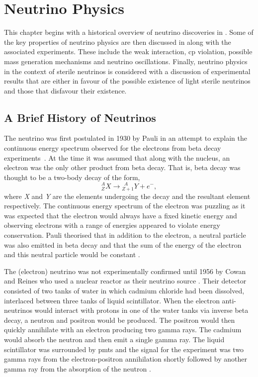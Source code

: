 \chapter{Neutrino Physics}
\label{chap:Neutrino Physics}

This chapter begins with a historical overview of neutrino discoveries in . Some of the key properties of neutrino physics are then discussed in  along with the associated experiments. These include the weak interaction, \gls{cp} violation, possible mass generation mechanisms and neutrino oscillations. Finally, neutrino physics in the context of sterile neutrinos is considered with a discussion of experimental results that are either in favour of the possible existence of light sterile neutrinos and those that disfavour their existence. 

\section{A Brief History of Neutrinos}\label{sec:history_of_neutrino_flavours}

The neutrino was first postulated in 1930 by Pauli in an attempt to explain the continuous energy spectrum observed for the electrons from beta decay experiments~\cite{Pauli_letter}. At the time it was assumed that along with the nucleus, an electron was the only other product from beta decay. That is, beta decay was thought to be a two-body decay of the form,
\begin{equation}
    {^A_Z}X \longrightarrow {^{\ \ A}_{Z+1}}Y + e^-,
\end{equation}
where \textit{X} and \textit{Y} are the elements undergoing the decay and the resultant element respectively. The continuous energy spectrum of the electron was puzzling as it was expected that the electron would always have a fixed kinetic energy and observing electrons with a range of energies appeared to violate energy conservation. Pauli theorised that in addition to the electron, a neutral particle was also emitted in beta decay and that the sum of the energy of the electron and this neutral particle would be constant \cite{Pauli_letter}.

The (electron) neutrino was not experimentally confirmed until 1956 by Cowan and Reines who used a nuclear reactor as their neutrino source \cite{cowan_and_reines_paper}. Their detector consisted of two tanks of water in which cadmium chloride had been dissolved, interlaced between three tanks of liquid scintillator. When the electron anti-neutrinos would interact with protons in one of the water tanks via inverse beta decay, a neutron and positron would be produced. The positron would then quickly annihilate with an electron producing two gamma rays. The cadmium would absorb the neutron and then emit a single gamma ray. The liquid scintillator was surrounded by \Glspl{pmt} and the signal for the experiment was two gamma rays from the electron-positron annihilation shortly followed by another gamma ray from the absorption of the neutron \cite{cowan_and_reines_paper}.


